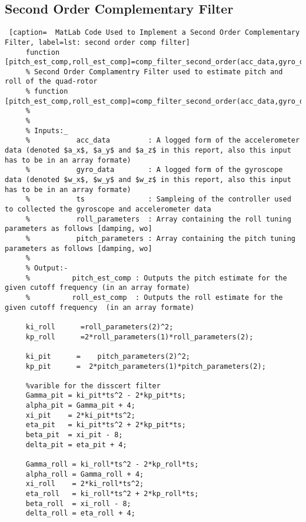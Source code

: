    
   
      \subsection{Second Order Complementary Filter} \label{sec: second order complmentary filter code}
      \begin{lstlisting} [caption=  MatLab Code Used to Implement a Second Order Complementary Filter, label=lst: second order comp filter]
     function [pitch_est_comp,roll_est_comp]=comp_filter_second_order(acc_data,gyro_data,ts,roll_parameters,pitch_parameters)  
     % Second Order Complamentry Filter used to estimate pitch and roll of the quad-rotor
     % function [pitch_est_comp,roll_est_comp]=comp_filter_second_order(acc_data,gyro_data,ts,roll_parameters,pitch_parameters) 
     %
     %
     % Inputs:_
     %           acc_data         : A logged form of the accelerometer data (denoted $a_x$, $a_y$ and $a_z$ in this report, also this input has to be in an array formate)
     %           gyro_data        : A logged form of the gyroscope data (denoted $w_x$, $w_y$ and $w_z$ in this report, also this input has to be in an array formate)
     %           ts               : Sampleing of the controller used to collected the gyroscope and accelerometer data
     %           roll_parameters  : Array containing the roll tuning parameters as follows [damping, wo]
     %           pitch_parameters : Array containing the pitch tuning parameters as follows [damping, wo]
     %
     % Output:-  
     %          pitch_est_comp : Outputs the pitch estimate for the given cutoff frequency (in an array formate)
     %          roll_est_comp  : Outputs the roll estimate for the given cutoff frequency  (in an array formate)
     
     ki_roll      =roll_parameters(2)^2;
     kp_roll      =2*roll_parameters(1)*roll_parameters(2);
     
     ki_pit      =    pitch_parameters(2)^2; 
     kp_pit      =  2*pitch_parameters(1)*pitch_parameters(2);  
     
     %varible for the disscert filter
     Gamma_pit = ki_pit*ts^2 - 2*kp_pit*ts;
     alpha_pit = Gamma_pit + 4;
     xi_pit    = 2*ki_pit*ts^2;
     eta_pit   = ki_pit*ts^2 + 2*kp_pit*ts;
     beta_pit  = xi_pit - 8;
     delta_pit = eta_pit + 4;
     
     Gamma_roll = ki_roll*ts^2 - 2*kp_roll*ts;
     alpha_roll = Gamma_roll + 4;
     xi_roll    = 2*ki_roll*ts^2;
     eta_roll   = ki_roll*ts^2 + 2*kp_roll*ts;
     beta_roll  = xi_roll - 8;
     delta_roll = eta_roll + 4;
     

\end{lstlisting}
